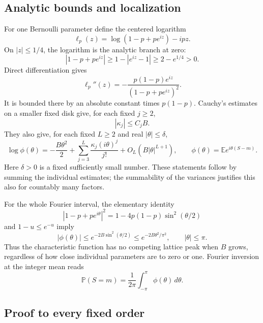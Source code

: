 \documentclass[11pt,letterpaper]{article}
\theoremstyle{remark}\newtheorem{remark}[theorem]{Remark}
\newcommand{\E}{\mathbb E}\newcommand{\Pp}{\mathbb P}
\newcommand{\Prob}{\mathbb P}
\begin{document}
\subsection{Analytic bounds and localization}

For one Bernoulli parameter define the centered logarithm
\[
 \ell_p(z)=\log(1-p+pe^{iz})-ipz.
\]
On $|z|\le1/4$, the logarithm is the analytic branch at zero:
\[
 |1-p+pe^{iz}|\ge 1-|e^{iz}-1|\ge2-e^{1/4}>0.
\]
Direct differentiation gives
\[
 \ell_p''(z)=-\frac{p(1-p)e^{iz}}{(1-p+pe^{iz})^2}.
\]
It is bounded there by an absolute constant times $p(1-p)$.
Cauchy's estimates on a smaller fixed disk give, for each fixed $j\ge2$,
\begin{equation}\label{lcw:ulb:eq:cumulantbound}
 |\kappa_j|\le C_jB.
\end{equation}
They also give, for each fixed $L\ge2$ and real $|\theta|\le\delta$,
\begin{equation}\label{lcw:ulb:eq:logphi}
 \log\phi(\theta)
 =-\frac{B\theta^2}{2}
  +\sum_{j=3}^{L}\frac{\kappa_j(i\theta)^j}{j!}
  +O_L(B|\theta|^{L+1}),
 \qquad \phi(\theta)=\E e^{i\theta(S-m)}.
\end{equation}
Here $\delta>0$ is a fixed sufficiently small number. These statements
follow by summing the individual estimates; the summability of the
variances justifies this also for countably many factors.

For the whole Fourier interval, the elementary identity
\[
 |1-p+pe^{i\theta}|^2=1-4p(1-p)\sin^2(\theta/2)
\]
and $1-u\le e^{-u}$ imply
\begin{equation}\label{lcw:ulb:eq:localization}
 |\phi(\theta)|\le e^{-2B\sin^2(\theta/2)}
 \le e^{-2B\theta^2/\pi^2},\qquad |\theta|\le\pi.
\end{equation}
Thus the characteristic function has no competing lattice peak when
$B$ grows, regardless of how close individual parameters are to zero
or one. Fourier inversion at the integer mean reads
\begin{equation}\label{lcw:ulb:eq:inversion}
 \Prob(S=m)=\frac1{2\pi}\int_{-\pi}^{\pi}\phi(\theta)\,d\theta.
\end{equation}

\subsection{Proof to every fixed order}
\end{document}
